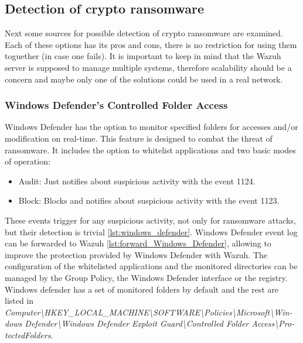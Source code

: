 \subsection{Detection of crypto ransomware}
Next some sources for possible detection of crypto ransomware are examined.
Each of these options has its pros and cons, there is no restriction for using them toguether (in case one fails).
It is important to keep in mind that the Wazuh server is supposed to manage multiple systems, therefore scalability should be a concern and maybe only one of the solutions could be used in a real network.

\subsubsection{Windows Defender's Controlled Folder Access}
Windows Defender has the option to monitor specified folders for accesses and/or modification on real-time.
This feature is designed to combat the threat of ransomware.
It includes the option to whitelist applications and two basic modes of operation\cite{hardening_windows_10}:
\begin{itemize}
	\item Audit: Just notifies about suspicious activity with the event 1124.
	\item Block: Blocks and notifies about suspicious activity with the event 1123.
\end{itemize}
\linej
These events trigger for any suspicious activity, not only for ransomware attacks, but their detection is trivial \ref{lst:windows_defender}.
Windows Defender event log can be forwarded to Wazuh \ref{lst:forward_Windows_Defender}, allowing to improve the protection provided by Windows Defender with Wazuh.
The configuration of the whitelisted applications and the monitored directories can be managed by the Group Policy, the Windows Defender interface or the registry.
\linej
Windows defender has a set of monitored folders by default and the rest are listed in \textit{Computer{\textbackslash}HKEY\_LOCAL\_MACHINE{\textbackslash}SOFTWARE{\textbackslash}Policies{\textbackslash}Microsoft{\textbackslash}Win- dows Defender{\textbackslash}Windows Defender Exploit Guard{\textbackslash}Controlled Folder Access{\textbackslash}Pro- tectedFolders}.

